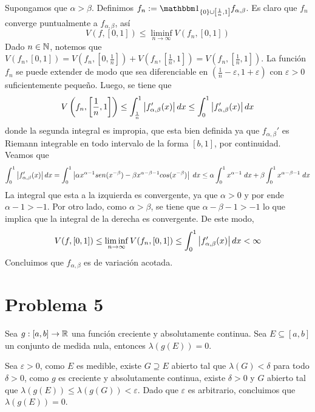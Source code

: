 \documentclass{article}
\begin{document}
\vspace{2mm}
\noindent Supongamos que $\alpha>\beta$. Definimos $f_{n}:=\I_{\{0\}\cup\left[\frac{1}{n},1\right]}
f_{\alpha,\beta}$. Es claro que $f_{n}$ converge puntualmente a $f_{\alpha,\beta}$, así
\begin{equation*}
    V(f,[0,1])\leq\liminf\limits_{n\to\infty}V(f_{n},[0,1])
\end{equation*}
Dado $n\in\mathbb{N}$, notemos que $V(f_{n},[0,1])=V(f_{n},\left[0,\frac{1}{n}\right])
+V(f_{n},\left[\frac{1}{n},1\right])=V(f_{n},\left[\frac{1}{n},1\right])$. La función $f_{n}$ se 
puede extender de modo que sea diferenciable en $(\frac{1}{n}-\varepsilon,1+\varepsilon)$ con 
$\varepsilon>0$ suficientemente pequeño. Luego, se tiene que
\begin{equation*}
    V\left(f_{n},\left[\frac{1}{n},1\right]\right)\leq\int_{\frac{1}{n}}^{1}
    \left|f_{\alpha,\beta}'(x) \right|dx\leq\int_{0}^{1}\left|f_{\alpha,\beta}'(x) \right|dx
\end{equation*}
donde la segunda integral es impropia, que esta bien definida ya que $f_{\alpha,\beta}'$ es 
Riemann integrable en todo intervalo de la forma $[b,1]$, por continuidad. Veamos que
\begin{equation*}
    \int_{0}^{1}\left|f_{\alpha,\beta}'(x) \right|dx=\int_{0}^{1}\left|\alpha x^{\alpha-1}sen(x^{-\beta})
    -\beta x^{\alpha-\beta-1}cos(x^{-\beta}) \right|\hspace{1mm}dx\leq\alpha\int_{0}^{1}x^{\alpha-1}
    \hspace{1mm}dx+\beta\int_{0}^{1}x^{\alpha-\beta-1}\hspace{1mm}dx
\end{equation*}
La integral que esta a la izquierda es convergente, ya que $\alpha>0$ y por ende $\alpha-1>-1$. Por 
otro lado, como $\alpha>\beta$, se tiene que $\alpha-\beta-1>-1$ lo que implica que la integral de 
la derecha es convergente. De este modo,
\begin{equation*}
    V(f,[0,1])\leq\liminf\limits_{n\to\infty}V(f_{n},[0,1])\leq
    \int_{0}^{1}\left|f_{\alpha,\beta}'(x) \right|dx<\infty
\end{equation*}
Concluimos que $f_{\alpha,\beta}$ es de variación acotada.

\section*{Problema 5}
\begin{lema}
    Sea $g:[a,b]\to\mathbb{R}$ una función creciente y absolutamente continua. Sea $E\subseteq[a,b]$ un
    conjunto de medida nula, entonces $\lambda(g(E))=0$.
\end{lema}
\begin{dem}
    Sea $\varepsilon>0$, como $E$ es medible, existe $G\supseteq E$ abierto tal que 
    $\lambda(G)<\delta$ para todo $\delta>0$, como $g$ es creciente y absolutamente continua, 
    existe $\delta>0$ y $G$ abierto tal que $\lambda(g(E))\leq\lambda(g(G))<\varepsilon$. Dado que
    $\varepsilon$ es arbitrario, concluimos que $\lambda(g(E))=0$.
\end{dem}
\end{document}

